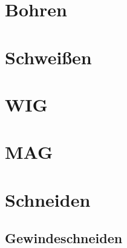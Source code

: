 \documentclass[
	a4paper,
	smallheadings,
	german,
	]
	{scrreprt}
\begin{document}
\section{Bohren}
\section{Schweißen}
	\section{WIG}
	\section{MAG}
\section{Schneiden}
\subsection{Gewindeschneiden}


\printbibliography
\end{document}
